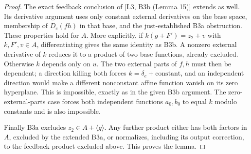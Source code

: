 \documentclass[11pt,a4paper]{article}
\begin{document}
\begin{proof}
The exact feedback conclusion of [L3, B3b (Lemma 15)] extends as well. Its derivative argument uses only constant external derivatives on the base space, membership of $D_e(fh)$ in that base, and the just-established B3a obstruction. These properties hold for $A$. More explicitly, if $k(g+F')=z_2+v$ with $k,F',v\in A$, differentiating gives the same identity as B3b. A nonzero external derivative of $k$ reduces it to a product of two base functions, already excluded. Otherwise $k$ depends only on $u$. The two external parts of $f,h$ must then be dependent; a direction killing both forces $k=\delta_e+\text{constant}$, and an independent direction would make a different nonconstant affine function vanish on its zero hyperplane. This is impossible, exactly as in the given B3b argument. The zero-external-parts case forces both independent functions $a_0,b_0$ to equal $k$ modulo constants and is also impossible.

Finally B3a excludes $z_2\in A+\langle g\rangle$. Any further product either has both factors in $A$, excluded by the extended B3a, or normalizes, including its output correction, to the feedback product excluded above. This proves the lemma.
\end{proof}
\end{document}
